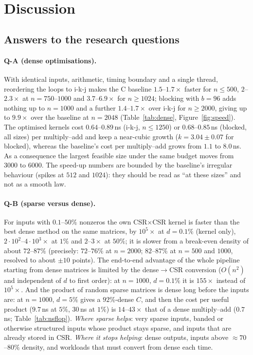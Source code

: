 \section{Discussion}

\subsection{Answers to the research questions}

\paragraph{Q-A (dense optimisations).} With identical inputs, arithmetic, timing boundary and a single thread, reordering the loops to i-k-j makes the C baseline $1.5$--$1.7\times$ faster for $n\le500$, $2$--$2.3\times$ at $n=750$--$1000$ and $3.7$--$6.9\times$
for $n\ge1024$; blocking with $b=96$ adds nothing up to $n=1000$ and a further $1.4$--$1.7\times$ over i-k-j for $n\ge2000$, giving up to $9.9\times$ over the baseline at $n=2048$ (Table~\ref{tab:dense}, Figure~\ref{fig:speed}). The optimised kernels cost
$0.64$--$0.89$\,ns (i-k-j, $n\le1250$) or $0.68$--$0.85$\,ns (blocked, all sizes) per multiply--add and keep a near-cubic growth ($k=3.04\pm0.07$ for blocked), whereas the baseline's cost per multiply--add grows from $1.1$ to $8.0$\,ns. As a consequence the largest feasible size under the same budget moves from $3000$ to $6000$.
The speed-up numbers are bounded by the baseline's irregular behaviour (spikes at $512$ and $1024$): they should be read as ``at these sizes'' and not as a smooth law.

\paragraph{Q-B (sparse versus dense).} For inputs with $0.1$--$50\%$ nonzeros the own CSR$\times$CSR kernel is faster than the best dense method on the same matrices, by $10^5\times$ at $d=0.1\%$ (kernel only), $2\cdot10^2$--$4\cdot10^3\times$ at $1\%$ and $2$--$3\times$ at $50\%$; it is slower from a break-even density of about $72$--$87\%$ (precisely: $72$--$76\%$ at $n=2000$; $82$--$87\%$ at $n=500$ and $1000$, resolved to about $\pm10$ points).
The end-to-end advantage of the whole pipeline starting from dense matrices is limited by the dense$\to$CSR conversion ($O(n^2)$ and independent of $d$ to first order): at $n=1000$, $d=0.1\%$ it is $155\times$ instead of $10^5\times$. And the product of random sparse matrices is dense long before the inputs are: at $n=1000$, $d=5\%$ gives a $92\%$-dense $C$, and then
the cost per useful product ($9.7$\,ns at $5\%$, $30$\,ns at $1\%$) is $14$--$43\times$ that of a dense multiply--add ($0.7$\,ns; Table~\ref{tab:nsflop}). \emph{Where sparse helps}: very sparse inputs, banded or otherwise structured inputs whose product stays sparse, and inputs that are already stored in CSR. \emph{Where it stops helping}: dense outputs, inputs above $\approx70$--$80\%$ density, and
workloads that must convert from dense each time.

